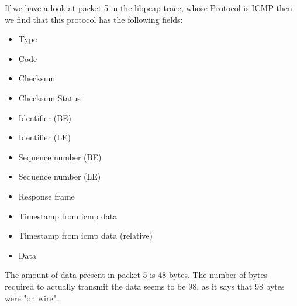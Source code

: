  \newline
\newline
If we have a look at packet 5 in the libpcap trace, whose Protocol is ICMP then we find that this protocol has the following fields: \begin{itemize}
    \item Type
    \item Code
    \item Checksum
    \item Checksum Status
    \item Identifier (BE)
    \item Identifier (LE)
    \item Sequence number (BE)
    \item Sequence number (LE)
    \item Response frame
    \item Timestamp from icmp data
    \item Timestamp from icmp data (relative)
    \item Data
\end{itemize}
 The amount of data present in packet 5 is 48 bytes. The number of bytes required to actually transmit the data seems to be 98, as it says that 98 bytes were "on wire".
